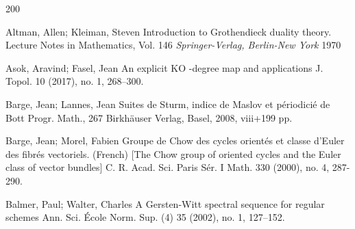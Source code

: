 \documentclass[12pt]{article}
\begin{document}
\begin{thebibliography}{200}

Altman, Allen; Kleiman, Steven Introduction to Grothendieck duality theory. Lecture Notes in Mathematics, Vol. 146 
{\it Springer-Verlag, Berlin-New York} 1970


 Asok, Aravind; Fasel, Jean
An explicit  KO -degree map and applications
%
J. Topol. 10 (2017), no. 1, 268–300.

Barge, Jean; Lannes, Jean
Suites de Sturm, indice de Maslov et p\'{e}riodici\'{e} de Bott
%
Progr. Math., 267
Birkh\"{a}user Verlag, Basel, 2008, viii+199 pp.

 Barge, Jean; Morel, Fabien Groupe de Chow des cycles orient\'{e}s et
classe d'Euler des fibr\'{e}s vectoriels. (French) [The Chow group of oriented cycles and the Euler class of vector bundles] C. R. Acad. Sci.
Paris Sér. I Math. 330 (2000), no. 4, 287-290.

%
 Balmer, Paul; Walter, Charles
A Gersten-Witt spectral sequence for regular schemes
Ann. Sci. École Norm. Sup. (4) 35 (2002), no. 1, 127–152.


%

%




%




\end{thebibliography}
\end{document}
